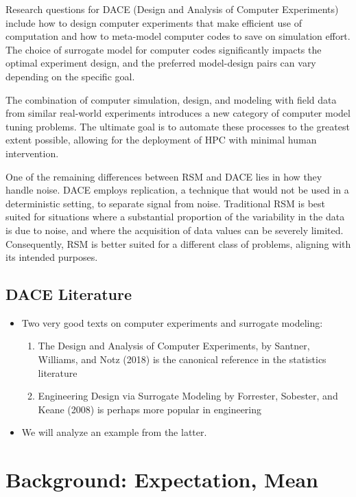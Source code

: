 \documentclass[
  letterpaper,
  DIV=11,
  numbers=noendperiod]{scrreprt}
\providecommand{\tightlist}{%
  \setlength{\itemsep}{0pt}\setlength{\parskip}{0pt}}\usepackage{longtable,booktabs,array}
\begin{document}
Research questions for DACE (Design and Analysis of Computer
Experiments) include how to design computer experiments that make
efficient use of computation and how to meta-model computer codes to
save on simulation effort. The choice of surrogate model for computer
codes significantly impacts the optimal experiment design, and the
preferred model-design pairs can vary depending on the specific goal.

The combination of computer simulation, design, and modeling with field
data from similar real-world experiments introduces a new category of
computer model tuning problems. The ultimate goal is to automate these
processes to the greatest extent possible, allowing for the deployment
of HPC with minimal human intervention.

One of the remaining differences between RSM and DACE lies in how they
handle noise. DACE employs replication, a technique that would not be
used in a deterministic setting, to separate signal from noise.
Traditional RSM is best suited for situations where a substantial
proportion of the variability in the data is due to noise, and where the
acquisition of data values can be severely limited. Consequently, RSM is
better suited for a different class of problems, aligning with its
intended purposes.

\hypertarget{dace-literature}{%
\subsection{DACE Literature}\label{dace-literature}}

\begin{itemize}
\tightlist
\item
  Two very good texts on computer experiments and surrogate modeling:

  \begin{enumerate}
  \def\labelenumi{\arabic{enumi}.}
  \tightlist
  \item
    The Design and Analysis of Computer Experiments, by Santner,
    Williams, and Notz (2018) is the canonical reference in the
    statistics literature
  \item
    Engineering Design via Surrogate Modeling by Forrester, Sobester,
    and Keane (2008) is perhaps more popular in engineering
  \end{enumerate}
\item
  We will analyze an example from the latter.
\end{itemize}

\hypertarget{background-expectation-mean}{%
\section{Background: Expectation,
Mean}\label{background-expectation-mean}}
\end{document}

